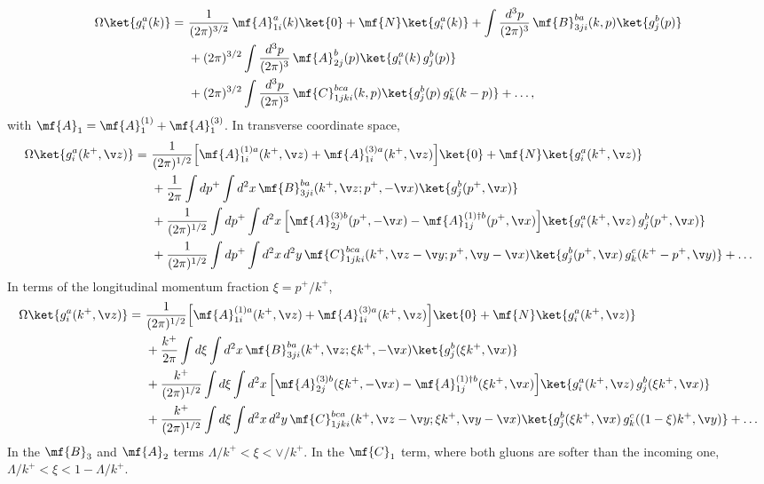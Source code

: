 \begin{align}\label{eq:Omegag}
\Omega\ket{g^{a}_{i}(k)} =\ &\frac{1}{(2\pi)^{3/2}}\,\mf{A}^{a}_{1i}(k)\ket{0}+\mf{N}\ket{g^{a}_{i}(k)}
+\int\frac{d^3p}{(2\pi)^3}\,\mf{B}^{ba}_{3ji}(k,p)\ket{g^{b}_{j}(p)}\notag\\
&+(2\pi)^{3/2}\int\frac{d^3p}{(2\pi)^3}\,\mf{A}^{b}_{2j}(p)\ket{g^{a}_{i}(k)\,g^{b}_{j}(p)}\notag\\
&+(2\pi)^{3/2}\int\frac{d^3p}{(2\pi)^3}\,\mf{C}^{bca}_{1jki}(k,p)\ket{g^{b}_{j}(p)\,g^{c}_{k}(k-p)}+\dots,
\end{align}
with $\mf{A}_{1}=\mf{A}^{(1)}_{1}+\mf{A}^{(3)}_{1}$. In transverse coordinate space,
\begin{align}\label{Omegaongpos}
\Omega\ket{g^{a}_{i}(k^{+},\v z)} =\ &\frac{1}{(2\pi)^{1/2}}\Big[\mf{A}^{(1)a}_{1i}(k^{+},\v z)+\mf{A}^{(3)a}_{1i}(k^{+},\v z)\Big]\ket{0}
+\mf{N}\ket{g^{a}_{i}(k^{+},\v z)}\notag\\
&+\frac{1}{2\pi}\int dp^{+}\int d^{2}x\,\mf{B}^{ba}_{3ji}(k^{+},\v z;p^{+},-\v x)\ket{g^{b}_{j}(p^{+},\v x)}\notag\\
&+\frac{1}{(2\pi)^{1/2}}\int dp^{+}\int d^{2}x\,\Big[\mf{A}^{(3)b}_{2j}(p^{+},-\v x)-\mf{A}^{(1)\dagger b}_{1j}(p^{+},\v x)\Big]
\ket{g^{a}_{i}(k^{+},\v z)\,g^{b}_{j}(p^{+},\v x)}\notag\\
&+\frac{1}{(2\pi)^{1/2}}\int dp^{+}\int d^{2}x\,d^{2}y\,\mf{C}^{bca}_{1jki}(k^{+},\v z-\v y;p^{+},\v y-\v x)
\ket{g^{b}_{j}(p^{+},\v x)\,g^{c}_{k}(k^{+}-p^{+},\v y)}+\dots
\end{align}
In terms of the longitudinal momentum fraction $\xi=p^{+}/k^{+}$,
\begin{align}\label{Omegaongposzeta}
\Omega\ket{g^{a}_{i}(k^{+},\v z)} =\ &\frac{1}{(2\pi)^{1/2}}\Big[\mf{A}^{(1)a}_{1i}(k^{+},\v z)+\mf{A}^{(3)a}_{1i}(k^{+},\v z)\Big]\ket{0}
+\mf{N}\ket{g^{a}_{i}(k^{+},\v z)}\notag\\
&+\frac{k^{+}}{2\pi}\int d\xi\int d^{2}x\,\mf{B}^{ba}_{3ji}(k^{+},\v z;\xi k^{+},-\v x)\ket{g^{b}_{j}(\xi k^{+},\v x)}\notag\\
&+\frac{k^{+}}{(2\pi)^{1/2}}\int d\xi\int d^{2}x\,\Big[\mf{A}^{(3)b}_{2j}(\xi k^{+},-\v x)-\mf{A}^{(1)\dagger b}_{1j}(\xi k^{+},\v x)\Big]
\ket{g^{a}_{i}(k^{+},\v z)\,g^{b}_{j}(\xi k^{+},\v x)}\notag\\
&+\frac{k^{+}}{(2\pi)^{1/2}}\int d\xi\int d^{2}x\,d^{2}y\,\mf{C}^{bca}_{1jki}(k^{+},\v z-\v y;\xi k^{+},\v y-\v x)
\ket{g^{b}_{j}(\xi k^{+},\v x)\,g^{c}_{k}((1-\xi)k^{+},\v y)}+\dots
\end{align}
In the $\mf{B}_{3}$ and $\mf{A}_{2}$ terms $\Lambda/k^{+}<\xi<\vee/k^{+}$. In the $\mf{C}_{1}$ term, where both
gluons are softer than the incoming one, $\Lambda/k^{+}<\xi<1-\Lambda/k^{+}$.

